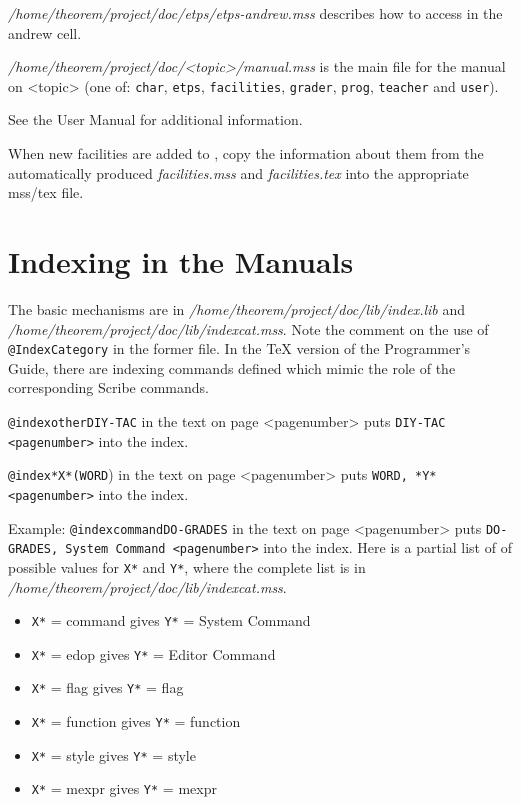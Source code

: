 {\it /home/theorem/project/doc/etps/etps-andrew.mss} describes how
to access \ETPS in the andrew cell.

{\it /home/theorem/project/doc/<topic>/manual.mss} is the main file
for the manual on <topic> (one of: {\tt char}, {\tt etps}, {\tt facilities}, 
{\tt grader}, {\tt prog}, {\tt teacher} and {\tt user}).

See the \TPS User Manual for additional information.

When new facilities are added to \ETPS, copy the information
about them from the automatically produced {\it facilities.mss} and {\it facilities.tex} into the
appropriate \ETPS mss/tex file.

\section{Indexing in the Manuals}

The basic mechanisms are in {\it /home/theorem/project/doc/lib/index.lib}
and {\it /home/theorem/project/doc/lib/indexcat.mss}. Note the comment on
the use of {\tt @IndexCategory} in the former file.  In the \TeX
version of the Programmer's Guide, there are indexing commands defined
which mimic the role of the corresponding Scribe commands.

{\tt @indexother{DIY-TAC}} in the text on page <pagenumber> puts
{\tt DIY-TAC <pagenumber>} into the index.

{\tt @index*X*(WORD}) in the text on page <pagenumber> puts
{\tt WORD, *Y* <pagenumber>} into the index.

Example:
{\tt @indexcommand{DO-GRADES}} in the text on page <pagenumber> puts
{\tt DO-GRADES, System Command <pagenumber>}
into the index. Here is a partial list of 
of possible values for {\tt *X*} and {\tt *Y*}, where the complete
list is in {\it /home/theorem/project/doc/lib/indexcat.mss}.

\begin{itemize}
\item {\tt *X*} = command gives {\tt *Y*} = System Command
 
\item {\tt *X*} = edop gives {\tt *Y*} = Editor Command
 
\item {\tt *X*} = flag gives {\tt *Y*} = flag
 
\item {\tt *X*} = function gives {\tt *Y*} = function
 
\item {\tt *X*} = style gives {\tt *Y*} = style

\item {\tt *X*} = mexpr gives {\tt *Y*} = mexpr
\end{itemize}

